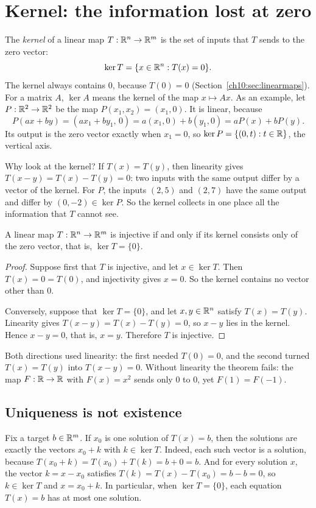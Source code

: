 \section{Kernel: the information lost at zero}\label{ch10:sec:kernel}
The \emph{kernel} of a linear map $T:\mathbb R^n\to\mathbb R^m$ is the set of inputs that $T$ sends to the zero vector:
\[
\ker T=\{x\in\mathbb R^n:T(x)=0\}.
\]
The kernel always contains $0$, because $T(0)=0$ (Section~\ref{ch10:sec:linearmaps}). For a matrix $A$, $\ker A$ means the kernel of the map $x\mapsto Ax$. As an example, let $P:\mathbb R^2\to\mathbb R^2$ be the map $P(x_1,x_2)=(x_1,0)$. It is linear, because
\[
P(ax+by)=(ax_1+by_1,\,0)=a(x_1,0)+b(y_1,0)=aP(x)+bP(y).
\]
Its output is the zero vector exactly when $x_1=0$, so $\ker P=\{(0,t):t\in\mathbb R\}$, the vertical axis.

Why look at the kernel? If $T(x)=T(y)$, then linearity gives $T(x-y)=T(x)-T(y)=0$: two inputs with the same output differ by a vector of the kernel. For $P$, the inputs $(2,5)$ and $(2,7)$ have the same output and differ by $(0,-2)\in\ker P$. So the kernel collects in one place all the information that $T$ cannot see.

\par\noindent\begin{minipage}{\linewidth}
\begin{theorem}\label{thm:kernel}
A linear map $T:\mathbb R^n\to\mathbb R^m$ is injective if and only if its kernel consists only of the zero vector, that is, $\ker T=\{0\}$.
\end{theorem}
\end{minipage}\par

\begin{proof}
Suppose first that $T$ is injective, and let $x\in\ker T$. Then $T(x)=0=T(0)$, and injectivity gives $x=0$. So the kernel contains no vector other than $0$.

Conversely, suppose that $\ker T=\{0\}$, and let $x,y\in\mathbb R^n$ satisfy $T(x)=T(y)$. Linearity gives $T(x-y)=T(x)-T(y)=0$, so $x-y$ lies in the kernel. Hence $x-y=0$, that is, $x=y$. Therefore $T$ is injective.
\end{proof}

Both directions used linearity: the first needed $T(0)=0$, and the second turned $T(x)=T(y)$ into $T(x-y)=0$. Without linearity the theorem fails: the map $F:\mathbb R\to\mathbb R$ with $F(x)=x^2$ sends only $0$ to $0$, yet $F(1)=F(-1)$.

\subsection*{Uniqueness is not existence}
Fix a target $b\in\mathbb R^m$. If $x_0$ is one solution of $T(x)=b$, then the solutions are exactly the vectors $x_0+k$ with $k\in\ker T$. Indeed, each such vector is a solution, because $T(x_0+k)=T(x_0)+T(k)=b+0=b$. And for every solution $x$, the vector $k=x-x_0$ satisfies $T(k)=T(x)-T(x_0)=b-b=0$, so $k\in\ker T$ and $x=x_0+k$. In particular, when $\ker T=\{0\}$, each equation $T(x)=b$ has at most one solution.

